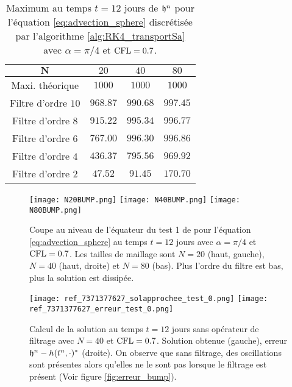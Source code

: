 \begin{table}[htbp]
\begin{center}
\begin{tabular}{|c||ccc|}
\hline 
$\mathbf{N}$ & $20$ & $40$ & $80$ \\ 
\hline 
\hline 
Maxi. théorique & $1000$ & $1000$ & $1000$ \\ 
Filtre d'ordre $10$ & $968.87$ & $990.68$ & $997.45$ \\ 
Filtre d'ordre $8$ & $915.22$ & $995.34$ & $996.77$ \\ 
Filtre d'ordre $6$ & $767.00$ & $996.30$ & $996.86$ \\  
Filtre d'ordre $4$ & $436.37$ & $795.56$ & $969.92$ \\ 
Filtre d'ordre $2$ & $47.52$ & $91.45$ & $170.70$ \\ 
\hline 
\end{tabular} 
\end{center}
\caption{Maximum au temps $t=12$ jours de $\mathfrak{h}^n$ pour l'équation \eqref{eq:advection_sphere} discrétisée par l'algorithme \ref{alg:RK4_transportSa} avec $\alpha = \pi / 4$ et $\text{CFL} = 0.7$.}
\label{tab:max_bump}
\end{table} 

\begin{figure}[htbp]
\begin{center}
\texttt{[image: N20BUMP.png]}
\texttt{[image: N40BUMP.png]}
\texttt{[image: N80BUMP.png]}
\end{center}
\caption{Coupe au niveau de l'équateur du test 1 de \cite{Williamson1992} pour l'équation \eqref{eq:advection_sphere} au temps $t=12$ jours avec $\alpha = \pi / 4$ et $\text{CFL} = 0.7$. Les tailles de maillage sont $N=20$ (haut, gauche), $N=40$ (haut, droite) et $N=80$ (bas). Plus l'ordre du filtre est bas, plus la solution est dissipée.}
\label{fig:max_bump}
\end{figure}

\begin{figure}[htbp]
\begin{center}
\texttt{[image: ref\_7371377627\_solapprochee\_test\_0.png]}
\texttt{[image: ref\_7371377627\_erreur\_test\_0.png]}
\end{center}
\caption{Calcul de la solution au temps $t=12$ jours sans opérateur de filtrage avec $N=40$ et $\text{CFL} = 0.7$. Solution obtenue (gauche), erreur $\mathfrak{h}^n - h(t^n,\cdot)^*$ (droite). On observe que sans filtrage, des oscillations sont présentes alors qu'elles ne le sont pas lorsque le filtrage est présent (Voir figure \ref{fig:erreur_bump}).}
\label{fig:parasite_bump}
\end{figure}








